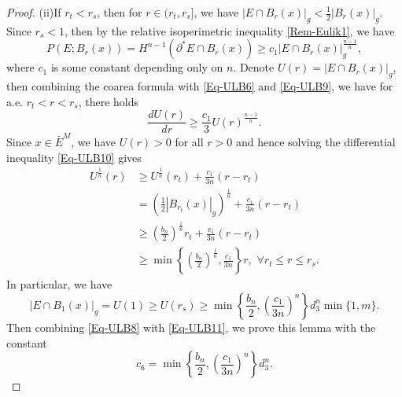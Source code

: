 \documentclass[11pt,reqno]{amsart}
\theoremstyle{definition}
\theoremstyle{remark}
\numberwithin{equation}{section}
\renewcommand{\(}{\left(}
\renewcommand{\)}{\right)}
\renewcommand{\-}{\overline}
\begin{document}
\begin{proof}
(ii)If $r_t<r_s$, then for $r\in (r_t,r_s]$, we have $|E\cap B_r(x)|_g<\frac{1}{2}|B_r(x)|_g$. Since $r_s<1$, then by the relative isoperimetric inequality \eqref{Rem-Eulik1}, we have
\begin{equation}\label{Eq-ULB9}
	P(E;B_r(x))=H^{n-1}(\partial^{*}E\cap B_r(x))\geq c_1|E\cap B_r(x)|_g^{\frac{n-1}{n}},
\end{equation}
where $c_1$ is some constant depending only on $n$. Denote $U(r)=|E\cap B_r(x)|_g$, then combining the coarea formula with \eqref{Eq-ULB6} and \eqref{Eq-ULB9}, we have for a.e. $r_t<r<r_s$, there holds
\begin{equation}\label{Eq-ULB10}
	\frac{d U(r)}{dr}\geq\frac{c_1}{3} U(r)^{\frac{n-1}{n}}.
\end{equation} 
Since $x\in\bar{E}^M$, we have $U(r)>0$ for all $r>0$ and hence solving the differential inequality \eqref{Eq-ULB10} gives
\begin{align*}
	U^{\frac{1}{n}}(r)&\geq U^{\frac{1}{n}}(r_t)+\frac{c_1}{3n}(r-r_t)\\
	&= \left(\frac{1}{2}|B_{r_t}(x)|_g\right)^{\frac{1}{n}}+\frac{c_1}{3n}(r-r_t)\\
	&\geq \left(\frac{b_n}{2}\right)^{\frac{1}{n}}r_t+\frac{c_1}{3n}(r-r_t)\\
	&\geq\min\left\{\left(\frac{b_n}{2}\right)^{\frac{1}{n}},\frac{c_1}{3n}\right\}r ,\,\,\forall r_t\leq r\leq r_s.
\end{align*}
In particular, we have
\begin{equation}\label{Eq-ULB11}
	|E\cap B_1(x)|_g=U(1)\geq U(r_s)\geq \min\left\{\frac{b_n}{2},\left(\frac{c_1}{3n}\right)^n\right\}d_3^n\min\{1,m\}.
\end{equation}
Then combining \eqref{Eq-ULB8} with \eqref{Eq-ULB11}, we prove this lemma with the constant
\begin{equation*}
	c_6=\min\left\{\frac{b_n}{2},\left(\frac{c_1}{3n}\right)^n\right\}d_3^n.
\end{equation*}
\end{proof}
\end{document}
